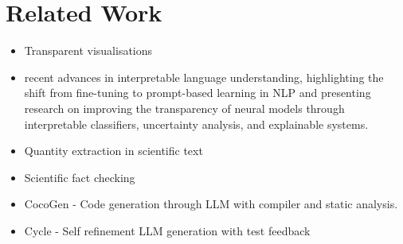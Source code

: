 \section{Related Work}
\label{sec:related}


\begin{itemize}
    \item Transparent visualisations \cite{perera22,bond25,psallidas18smoke}
    \item recent advances in interpretable language understanding, highlighting the shift from fine-tuning to prompt-based learning in NLP and presenting research on improving the transparency of neural models through interpretable classifiers, uncertainty analysis, and explainable systems. \cite{Yulan_2023}
    \item Quantity extraction in scientific text \cite{bolucu-etal-2023-investigating}
    \item Scientific fact checking \cite{abu-ahmad-etal-2025-climatecheck-shared}
    \item CocoGen - Code generation through LLM with compiler and static analysis.  \cite{bi-etal-2024-iterative}
    \item Cycle - Self refinement LLM generation with test feedback \cite{cycle_2024}

\end{itemize}



